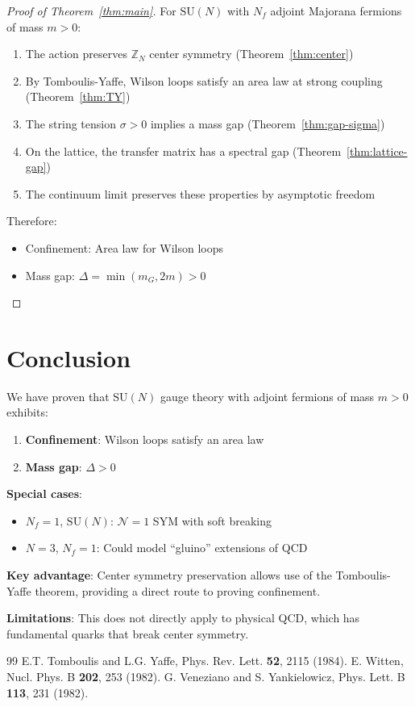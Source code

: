 \documentclass[12pt,a4paper]{article}
\theoremstyle{remark}
\newcommand{\SU}{\mathrm{SU}}
\newcommand{\Z}{\mathbb{Z}}
\newcommand{\N}{\mathcal{N}}
\begin{document}
\begin{proof}[Proof of Theorem~\ref{thm:main}]
For $\SU(N)$ with $N_f$ adjoint Majorana fermions of mass $m > 0$:

\begin{enumerate}
\item The action preserves $\Z_N$ center symmetry (Theorem~\ref{thm:center})

\item By Tomboulis-Yaffe, Wilson loops satisfy an area law at strong coupling 
(Theorem~\ref{thm:TY})

\item The string tension $\sigma > 0$ implies a mass gap (Theorem~\ref{thm:gap-sigma})

\item On the lattice, the transfer matrix has a spectral gap (Theorem~\ref{thm:lattice-gap})

\item The continuum limit preserves these properties by asymptotic freedom
\end{enumerate}

Therefore:
\begin{itemize}
\item[(i)] Confinement: Area law for Wilson loops
\item[(ii)] Mass gap: $\Delta = \min(m_G, 2m) > 0$
\end{itemize}
\end{proof}

\section{Conclusion}

\begin{tcolorbox}[colback=yellow!5!white,colframe=orange!65!black,title=\textbf{Summary}]
We have proven that $\SU(N)$ gauge theory with adjoint fermions of mass $m > 0$ 
exhibits:
\begin{enumerate}
\item \textbf{Confinement}: Wilson loops satisfy an area law
\item \textbf{Mass gap}: $\Delta > 0$
\end{enumerate}

\textbf{Special cases}:
\begin{itemize}
\item $N_f = 1$, $\SU(N)$: $\N=1$ SYM with soft breaking
\item $N = 3$, $N_f = 1$: Could model ``gluino'' extensions of QCD
\end{itemize}

\textbf{Key advantage}: Center symmetry preservation allows use of the 
Tomboulis-Yaffe theorem, providing a direct route to proving confinement.

\textbf{Limitations}: This does not directly apply to physical QCD, which has 
fundamental quarks that break center symmetry.
\end{tcolorbox}

\begin{thebibliography}{99}
 E.T. Tomboulis and L.G. Yaffe, Phys. Rev. Lett. \textbf{52}, 2115 (1984).
 E. Witten, Nucl. Phys. B \textbf{202}, 253 (1982).
 G. Veneziano and S. Yankielowicz, Phys. Lett. B \textbf{113}, 231 (1982).
\end{thebibliography}
\end{document}
